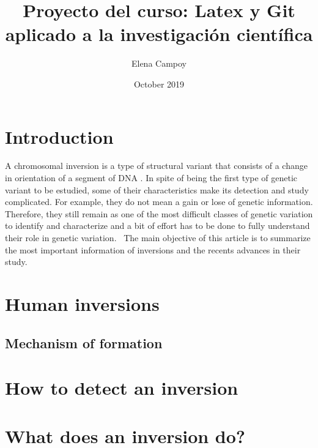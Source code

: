 \documentclass{article}
\title{Proyecto del curso: Latex y Git aplicado a la investigación científica}
\author{Elena Campoy}
\date{October 2019}
\begin{document}
\maketitle

\section{Introduction}
A chromosomal inversion is a type of structural variant that consists of a change in orientation of a segment of DNA \cite{puig_human_2015, giner-delgado_evolutionary_2019}. In spite of being the first type of genetic variant to be estudied, some of their characteristics make its detection and study complicated. For example, they do not mean a gain or lose of genetic information. Therefore, they still remain as one of the most difficult classes of genetic variation to identify and characterize \cite{puig_determining_2019} and a bit of effort has to be done to fully understand their role in genetic variation. 
\
The main objective of this article is to summarize the most important information of inversions and the recents advances in their study. 
\section{Human inversions}
\subsection{Mechanism of formation}

\section{How to detect an inversion}
\section{What does an inversion do?}
\newpage


\end{document}
